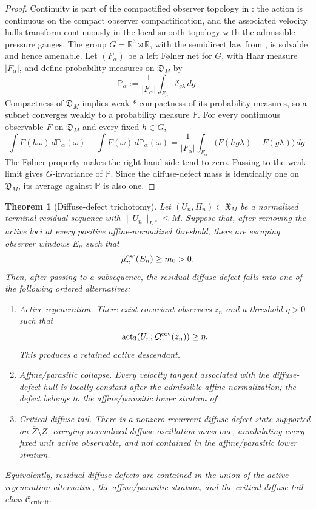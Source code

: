 \documentclass[11pt]{amsart}
\numberwithin{equation}{section}
\theoremstyle{plain}
\newtheorem{theorem}{Theorem}[section]
\theoremstyle{definition}
\theoremstyle{remark}
\newcommand{\Ccritdiff}{\mathcal C_{\mathrm{critdiff}}}
\newcommand{\actthree}{\operatorname{act}_3}
\begin{document}
\begin{proof}
Continuity is part of the compactified observer topology in
: the action is continuous on the compact
observer compactification, and the associated velocity hulls transform
continuously in the local smooth topology with the admissible pressure gauges.
The group \(G=\mathbb R^3\rtimes\mathbb R\), with the semidirect law from
, is solvable and hence amenable.  Let
\((F_\alpha)\) be a left Følner net for \(G\), with Haar measure \(|F_\alpha|\),
and define probability measures on \(\mathfrak D_M\) by
\[
   \mathbb P_\alpha
   :=
   \frac1{|F_\alpha|}
   \int_{F_\alpha}\delta_{g\lambda}\,dg .
\]
Compactness of \(\mathfrak D_M\) implies weak-* compactness of its probability
measures, so a subnet converges weakly to a probability measure \(\mathbb P\).
For every continuous observable \(F\) on \(\mathfrak D_M\) and every fixed
\(h\in G\),
\[
   \int F(h\omega)\,d\mathbb P_\alpha(\omega)
   -
   \int F(\omega)\,d\mathbb P_\alpha(\omega)
   =
   \frac1{|F_\alpha|}
   \int_{F_\alpha}\bigl(F(hg\lambda)-F(g\lambda)\bigr)\,dg .
\]
The Følner property makes the right-hand side tend to zero.  Passing to the
weak limit gives \(G\)-invariance of \(\mathbb P\).  Since the diffuse-defect
mass is identically one on \(\mathfrak D_M\), its average against
\(\mathbb P\) is also one.
\end{proof}

\begin{theorem}[Diffuse-defect trichotomy]
\label{thm:diffuse-defect-trichotomy}
Let \((U_n,\Pi_n)\subset\mathfrak X_M\) be a normalized terminal residual
sequence with \(\|U_n\|_{L^\infty}\le M\).  Suppose that, after removing the
active loci at every positive affine-normalized threshold, there are escaping
observer windows \(E_n\) such that
\[
   \mu_n^{\rm osc}(E_n)\ge m_0>0 .
\]
Then, after passing to a subsequence, the residual diffuse defect falls into
one of the following ordered alternatives:
\begin{enumerate}[label=\textup{D\arabic*.}]
   \item \emph{Active regeneration.}  There exist covariant observers \(z_n\)
   and a threshold \(\eta>0\) such that
   \[
      \actthree(U_n;\mathcal Q_1^{\rm cov}(z_n))\ge\eta .
   \]
   This produces a retained active descendant.
   \item \emph{Affine/parasitic collapse.}  Every velocity tangent associated
   with the diffuse-defect hull is locally constant after the admissible affine
   normalization; the defect belongs to the affine/parasitic lower stratum of
   .
   \item \emph{Critical diffuse tail.}  There is a nonzero recurrent
   diffuse-defect state supported on \(\overline Z\setminus Z\), carrying
   normalized diffuse oscillation mass one, annihilating every fixed unit
   active observable, and not contained in the affine/parasitic lower stratum.
\end{enumerate}
Equivalently, residual diffuse defects are contained in the union of the active
regeneration alternative, the affine/parasitic stratum, and the critical diffuse-tail
class \(\Ccritdiff\).
\end{theorem}
\end{document}
